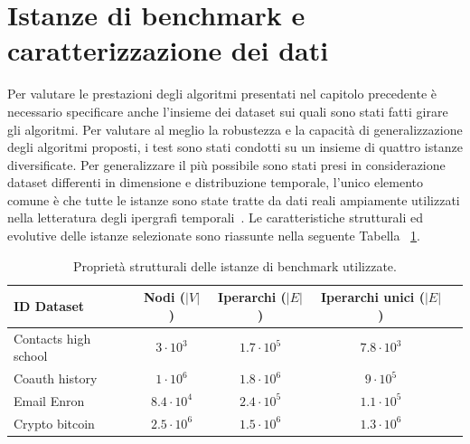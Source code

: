 
\section{Istanze di benchmark e caratterizzazione dei dati}\label{sec:istanze_di_benchmark_e_caratterizzazione_dei_dati}

Per valutare le prestazioni degli algoritmi presentati nel capitolo precedente è necessario specificare anche l'insieme dei dataset sui quali sono stati fatti girare gli algoritmi.
Per valutare al meglio la robustezza e la capacità di generalizzazione degli algoritmi proposti, i test sono stati condotti su un insieme di quattro istanze diversificate.
Per generalizzare il più possibile sono stati presi in considerazione dataset differenti in dimensione e distribuzione temporale, l'unico elemento comune è che tutte le istanze sono state tratte da dati reali ampiamente utilizzati nella letteratura degli ipergrafi temporali~\cite{lotito2023}.
Le caratteristiche strutturali ed evolutive delle istanze selezionate sono riassunte nella seguente Tabella ~\ref{tab:caratteristiche_dataset}.
\begin{table}[htbp]
\centering
\caption{Proprietà strutturali delle istanze di benchmark utilizzate.}
\label{tab:caratteristiche_dataset}
\begin{tabular}{lcccc}
\hline
\textbf{ID Dataset} & \textbf{Nodi ($|V|$)} & \textbf{Iperarchi ($|E|$)} & \textbf{Iperarchi unici ($|E|$)} \\ \hline
Contacts high school& $3\cdot 10^3$         & $1.7\cdot 10^5$             & $7.8\cdot 10^3$     \\
Coauth history      & $1\cdot 10^6$         & $1.8\cdot 10^6$             & $9\cdot 10^5$       \\
Email Enron         & $8.4\cdot 10^4$       & $2.4\cdot 10^5$             & $1.1\cdot 10^5$     \\
Crypto bitcoin      & $2.5\cdot 10^6$       & $1.5\cdot 10^6$             & $1.3\cdot 10^6$     \\ \hline
\end{tabular}
\end{table}

